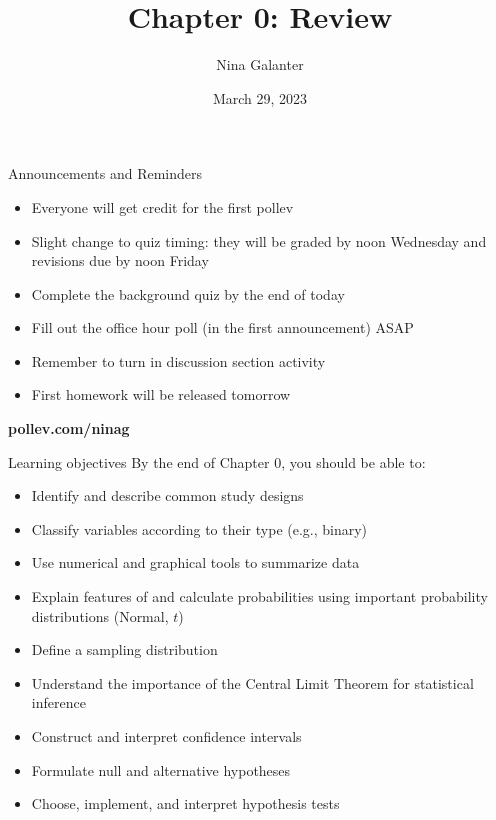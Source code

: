 \documentclass[10pt,t]{beamer}
\title{Chapter 0: Review}
\author{Nina Galanter}
\date{March 29, 2023}
\begin{document}
	
	
	\begin{frame}{Announcements and Reminders}
		
		\begin{itemize}
			\item Everyone will get credit for the first pollev 
			\medskip
			\item Slight change to quiz timing: they will be graded by noon Wednesday and revisions due by noon Friday
			\medskip
			\item Complete the background quiz by the end of today
			\medskip
			\item Fill out the office hour poll (in the first announcement) ASAP
			\medskip
			\item Remember to turn in discussion section activity
			\medskip
			\item First homework will be released tomorrow
		\end{itemize}
		
	\end{frame}
	
	\begin{frame}
	\titlepage 
	
	\centering
	\textbf{pollev.com/ninag}
\end{frame}




\begin{frame}{Learning objectives}
By the end of Chapter 0, you should be able to:
\medskip
\begin{itemize}
	\item Identify and describe common study designs
	\item Classify variables according to their type (e.g., binary)
	\item Use numerical and graphical tools to summarize data
	\item Explain features of and calculate probabilities using important probability distributions (Normal, $t$) 
	\item Define a sampling distribution
	\item Understand the importance of the Central Limit Theorem for statistical inference
	\item Construct and interpret confidence intervals
	\item Formulate null and alternative hypotheses
	\item Choose, implement, and interpret hypothesis tests
\end{itemize}
\end{frame}
\end{document}
